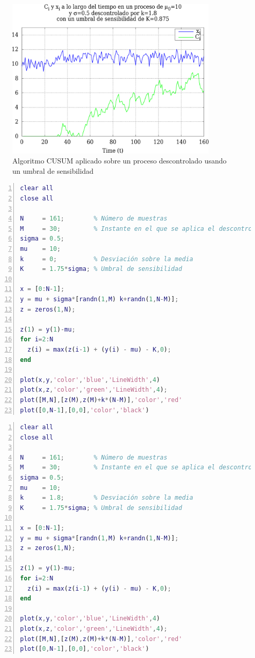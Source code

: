 \begin{figure}[htbp]
\centering
\includegraphics[width=0.9\textwidth]{CapituloCusum/Figuras/cusumDescontroladoUmbral-crop}
\caption{Algoritmo CUSUM aplicado sobre un proceso descontrolado usando un umbral de sensibilidad}
\end{figure}
%

\begin{lstlisting}[language=Matlab,caption={Algoritmo CUSUM en procesos bajo control con umbral de sensibilidad}, 
breaklines=true, label=code:cusum_controlado_umbral,numbers=left,float=htbp]
clear all
close all

N     = 161;        % Número de muestras
M     = 30;         % Instante en el que se aplica el descontrol
sigma = 0.5; 
mu    = 10;
k     = 0;          % Desviación sobre la media
K     = 1.75*sigma; % Umbral de sensibilidad

x = [0:N-1];
y = mu + sigma*[randn(1,M) k+randn(1,N-M)];
z = zeros(1,N);

z(1) = y(1)-mu;
for i=2:N
  z(i) = max(z(i-1) + (y(i) - mu) - K,0);
end

plot(x,y,'color','blue','LineWidth',4)
plot(x,z,'color','green','LineWidth',4);
plot([M,N],[z(M),z(M)+k*(N-M)],'color','red'
plot([0,N-1],[0,0],'color','black')
\end{lstlisting}

\begin{lstlisting}[language=Matlab,caption={Algoritmo CUSUM en procesos perturbados con umbral de sensibilidad}, 
breaklines=true, label=code:cusum_descontrolado_umbral,numbers=left,float=htbp]
clear all
close all

N     = 161;        % Número de muestras
M     = 30;         % Instante en el que se aplica el descontrol
sigma = 0.5; 
mu    = 10;
k     = 1.8;        % Desviación sobre la media
K     = 1.75*sigma; % Umbral de sensibilidad

x = [0:N-1];
y = mu + sigma*[randn(1,M) k+randn(1,N-M)];
z = zeros(1,N);

z(1) = y(1)-mu;
for i=2:N
  z(i) = max(z(i-1) + (y(i) - mu) - K,0);
end

plot(x,y,'color','blue','LineWidth',4)
plot(x,z,'color','green','LineWidth',4);
plot([M,N],[z(M),z(M)+k*(N-M)],'color','red'
plot([0,N-1],[0,0],'color','black')
\end{lstlisting}

